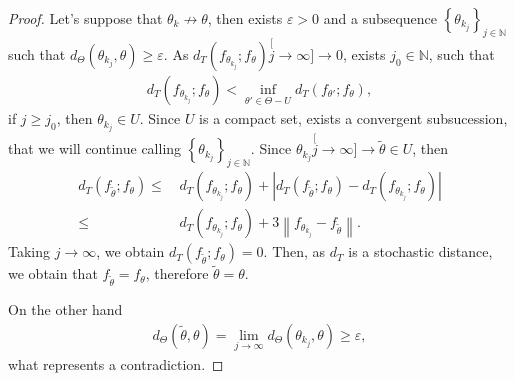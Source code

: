 \documentclass[journal]{IEEEtran}
\numberwithin{equation}{section}
\newenvironment{dem}[1][Proof]{\begin{proof}[{\it #1}]}{\end{proof}}
\newcommand{\al}{&\,}
\newcommand{\N}{\ensuremath{\mathbb{N}}}
\newcommand{\abs}[1]{\ensuremath{\left| #1 \right|}}
\newcommand{\norm}[1]{\ensuremath{\left\| #1 \right\|}}
\newcommand{\pa}[1]{\ensuremath{\left( #1 \right)}}
\newcommand{\set}[1]{\ensuremath{\left\{ #1 \right\}}}
\begin{document}
\begin{dem}
	Let's suppose that $\theta_{k}\not\to\theta$, then exists $\varepsilon>0$ and a subsequence
	$\set{\theta_{k_{j}}}_{j\in\N}$ such that $d_{\Theta}\pa{\theta_{k_{j}},\theta}\ge\varepsilon$.
	As $d_{T}\pa{f_{\theta_{k_{j}}};f_{\theta}}\stackrel[j\to\infty]{}{\longrightarrow}  0$, exists $j_{0}\in\N$, such that 
	\begin{align*}
	d_{T}\pa{f_{\theta_{k_{j}}};f_{\theta}} < \inf_{\theta'\in \Theta-U}d_{T}\pa{f_{\theta'};f_{\theta}},
	\end{align*}
	if $j\ge j_{0}$, then $\theta_{k_{j}}\in U$. Since $U$ is a compact set, exists a convergent subsucession,
	that we will continue calling $\set{\theta_{k_{j}}}_{j\in\N}$.
	Since $\theta_{k_{j}}\stackrel[j\to\infty]{}{\longrightarrow} \tilde{\theta}\in U$, then
	\begin{align*}
	d_{T}\pa{f_{\tilde{\theta}};f_{\theta}} \le \al d_{T}\pa{f_{\theta_{k_{j}}};f_{\theta}}
	+ \abs{d_{T}\pa{f_{\tilde{\theta}};f_{\theta}} - d_{T}\pa{f_{\theta_{k_{j}}};f_{\theta}}} \\
	\le \al d_{T}\pa{f_{\theta_{k_{j}}};f_{\theta}} + 3 \norm{f_{\theta_{k_{j}}} - f_{\tilde{\theta}}}.
	\end{align*}
	Taking $j\to\infty$, we obtain $d_{T}\pa{f_{\tilde{\theta}};f_{\theta}} = 0$. Then, as $d_T$ is a stochastic distance, we obtain that $f_{\tilde{\theta}}=f_{\theta}$, therefore  $\tilde{\theta}=\theta$.
	
	On the other hand
	\begin{align*}
	d_{\Theta}\pa{\tilde{\theta},\theta} = \lim_{j\to\infty}d_{\Theta}\pa{\theta_{k_{j}},\theta}\ge\varepsilon,
	\end{align*}
	what represents a contradiction.
\end{dem}

\vspace{0.2cm}
\end{document}
